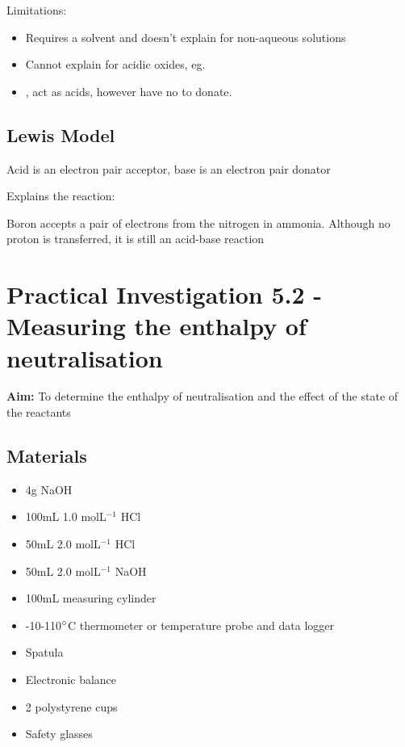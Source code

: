 		\bgroup
			\centering
		\egroup

		Limitations:
		\begin{itemize}
			\item Requires a solvent and doesn't explain for non-aqueous solutions
			\item Cannot explain for acidic oxides, eg. 
			\item {},  act as acids, however have no  to donate.
		\end{itemize}

	\subsection{Lewis Model}
		Acid is an electron pair acceptor, base is an electron pair donator
		
		Explains the  reaction:

		Boron accepts a pair of electrons from the nitrogen in ammonia. Although no proton is transferred, it is still an acid-base reaction

\section{Practical Investigation 5.2 - Measuring the enthalpy of neutralisation} \label{13/02/2025}
	\textbf{Aim:} To determine the enthalpy of neutralisation and the effect of the state of the reactants

	\subsection{Materials}
		\begin{itemize}
			\item 4g NaOH
			\item 100mL 1.0 molL$^{-1}$ HCl
			\item 50mL 2.0 molL$^{-1}$ HCl
			\item 50mL 2.0 molL$^{-1}$ NaOH
			\item 100mL measuring cylinder
			\item -10-110$\degree$C thermometer or temperature probe and data logger
			\item Spatula
			\item Electronic balance
			\item 2 polystyrene cups
			\item Safety glasses
		\end{itemize}

